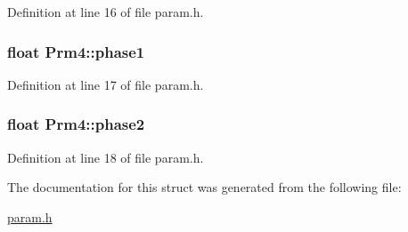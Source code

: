 Definition at line 16 of file param.h.\hypertarget{structPrm4_a9d2a99a83026538f913750076b481d42}{
\subsubsection[{phase1}]{\setlength{\rightskip}{0pt plus 5cm}float {\bf Prm4::phase1}}}
\label{structPrm4_a9d2a99a83026538f913750076b481d42}


Definition at line 17 of file param.h.\hypertarget{structPrm4_a2ebf28123921c775e194b713a6553aa8}{
\subsubsection[{phase2}]{\setlength{\rightskip}{0pt plus 5cm}float {\bf Prm4::phase2}}}
\label{structPrm4_a2ebf28123921c775e194b713a6553aa8}


Definition at line 18 of file param.h.

The documentation for this struct was generated from the following file:\begin{DoxyCompactItemize}
\item 
\hyperlink{param_8h}{param.h}\end{DoxyCompactItemize}
